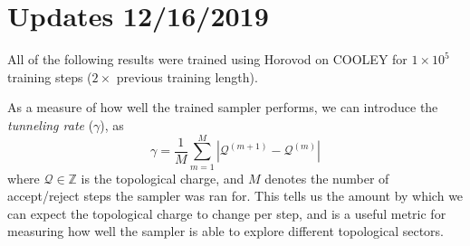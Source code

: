 \section{Updates 12/16/2019}%
\label{sec:updates2019_12_16}
All of the following results were trained using Horovod on COOLEY for
$1\times10^5$ training steps ($2\times$  previous training length).
%

As a measure of how well the trained sampler performs, we can introduce the
\emph{tunneling rate} ($\gamma$), as
%
\begin{equation}
  \gamma = \frac{1}{M}\sum_{m=1}^{M} |\mathcal{Q}^{(m+1)} - \mathcal{Q}^{(m)}|
\end{equation}
%
where $\mathcal{Q} \in \mathbb{Z}$ is the topological charge, and $M$ denotes
the number of accept/reject steps the sampler was ran for.
%
This tells us the amount by which we can expect the topological charge to
change per step, and is a useful metric for measuring how well the sampler is
able to explore different topological sectors.
%
